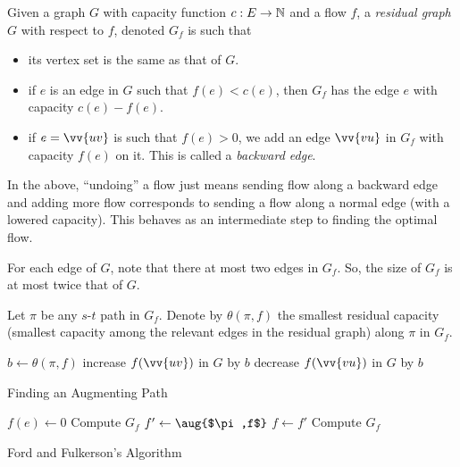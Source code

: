 	\begin{definition}
		Given a graph $G$ with capacity function $c:E\to\mathbb{N}$ and a flow $f$, a \textit{residual graph} $G$ with respect to $f$, denoted $G_f$ is such that
		\begin{itemize}
			\item its vertex set is the same as that of $G$.
			\item if $e$ is an edge in $G$ such that $f(e)<c(e)$, then $G_f$ has the edge $e$ with capacity $c(e)-f(e)$.
			\item if $e=\vv{uv}$ is such that $f(e)>0$, we add an edge $\vv{vu}$ in $G_f$ with capacity $f(e)$ on it. This is called a \textit{backward edge}.
		\end{itemize}
	\end{definition}

	In the above, ``undoing'' a flow just means sending flow along a backward edge and adding more flow corresponds to sending a flow along a normal edge (with a lowered capacity). This behaves as an intermediate step to finding the optimal flow.

	For each edge of $G$, note that there at most two edges in $G_f$. So, the size of $G_f$ is at most twice that of $G$.

	Let $\pi$ be any $s$-$t$ path in $G_f$. Denote by $\theta(\pi,f)$ the smallest residual capacity (smallest capacity among the relevant edges in the residual graph) along $\pi$ in $G_f$.\\

	\begin{algorithm}[H]
		\DontPrintSemicolon
		\SetNoFillComment
		 {
			$b\gets\theta(\pi,f)$\;
			 {
				 {
					increase $f(\vv{uv})$ in $G$ by $b$
				} {
					decrease $f(\vv{vu})$ in $G$ by $b$
				}
			}
		}
		\caption{Finding an Augmenting Path}\label{algo: aug path}
	\end{algorithm}

	\begin{algorithm}[H]
		\DontPrintSemicolon
		\SetNoFillComment
		 {
			$f(e)\gets 0$
		}
		Compute $G_f$\;
		 {
			$f'\gets\aug{$\pi,f$}$\;
			$f\gets f'$\;
			Compute $G_f$
		}
		\;
		\caption{Ford and Fulkerson's Algorithm}\label{algo: max flow}
	\end{algorithm}

